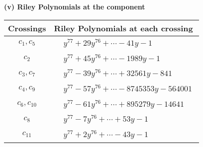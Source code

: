 \documentclass[1p]{elsarticle_modified}
\theoremstyle{definition}
\begin{document}
\flushleft \textbf{(v) Riley Polynomials at the component}\newline \\
\begin{tabular}{m{50pt}|m{274pt}}
Crossings & \hspace{64pt}Riley Polynomials at each crossing \\
\hline $$\begin{aligned}c_{1},c_{5}\end{aligned}$$&$\begin{aligned}
&y^{77}+29 y^{76}+\cdots-41 y-1
\end{aligned}$\\
\hline $$\begin{aligned}c_{2}\end{aligned}$$&$\begin{aligned}
&y^{77}+45 y^{76}+\cdots-1989 y-1
\end{aligned}$\\
\hline $$\begin{aligned}c_{3},c_{7}\end{aligned}$$&$\begin{aligned}
&y^{77}-39 y^{76}+\cdots+32561 y-841
\end{aligned}$\\
\hline $$\begin{aligned}c_{4},c_{9}\end{aligned}$$&$\begin{aligned}
&y^{77}-57 y^{76}+\cdots-8745353 y-564001
\end{aligned}$\\
\hline $$\begin{aligned}c_{6},c_{10}\end{aligned}$$&$\begin{aligned}
&y^{77}-61 y^{76}+\cdots+895279 y-14641
\end{aligned}$\\
\hline $$\begin{aligned}c_{8}\end{aligned}$$&$\begin{aligned}
&y^{77}-7 y^{76}+\cdots+53 y-1
\end{aligned}$\\
\hline $$\begin{aligned}c_{11}\end{aligned}$$&$\begin{aligned}
&y^{77}+2 y^{76}+\cdots-43 y-1
\end{aligned}$\\
\hline
\end{tabular}\\~\\
\end{document}
